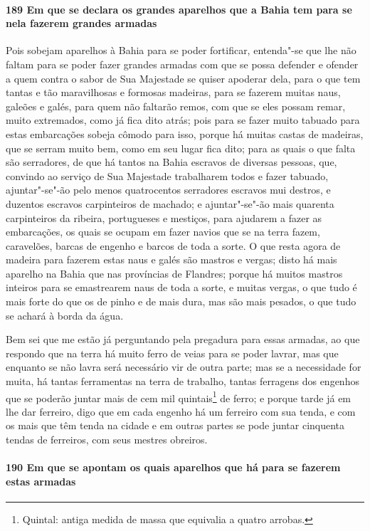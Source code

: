 \paragraph{189 Em que se declara os grandes aparelhos que a Bahia tem para se nela fazerem
grandes armadas}

Pois sobejam aparelhos à Bahia para se poder fortificar, entenda"-se que lhe não faltam
para se poder fazer grandes armadas com que se possa defender e ofender a quem contra o
sabor de Sua Majestade se quiser apoderar dela, para o que tem tantas e tão maravilhosas e
formosas madeiras, para se fazerem muitas naus, galeões e galés, para quem não faltarão
remos, com que se eles possam remar, muito extremados, como já fica dito atrás; pois para
se fazer muito tabuado para estas embarcações sobeja cômodo para isso, porque há muitas
castas de madeiras, que se serram muito bem, como em seu lugar fica dito; para as quais o
que falta são serradores, de que há tantos na Bahia escravos de diversas pessoas, que,
convindo ao serviço de Sua Majestade trabalharem todos e fazer tabuado, ajuntar"-se"-ão pelo
menos quatrocentos serradores escravos mui destros, e duzentos escravos carpinteiros de
machado; e ajuntar"-se"-ão mais quarenta carpinteiros da ribeira, portugueses e mestiços,
para ajudarem a fazer as embarcações, os quais se ocupam em fazer navios que se na terra
fazem, caravelões, barcas de engenho e barcos de toda a sorte. O que resta agora de
madeira para fazerem estas naus e galés são mastros e vergas; disto há mais aparelho na
Bahia que nas províncias de Flandres; porque há muitos mastros inteiros para se
emastrearem naus de toda a sorte, e muitas vergas, o que tudo é mais forte do que os de
pinho e de mais dura, mas são mais pesados, o que tudo se achará à borda da água.

Bem sei que me estão já perguntando pela pregadura para essas armadas, ao que respondo que
na terra há muito ferro de veias para se poder lavrar, mas que enquanto se não lavra será
necessário vir de outra parte; mas se a necessidade for muita, há tantas ferramentas na
terra de trabalho, tantas ferragens dos engenhos que se poderão juntar mais de cem mil
quintais\footnote{ Quintal: antiga medida de massa que equivalia a quatro arrobas.} de ferro; e
porque tarde já em lhe dar ferreiro, digo que em cada engenho há um ferreiro com sua
tenda, e com os mais que têm tenda na cidade e em outras partes se pode juntar cinquenta
tendas de ferreiros, com seus mestres obreiros.

\paragraph{190 Em que se apontam os quais aparelhos que há para se fazerem estas armadas}

